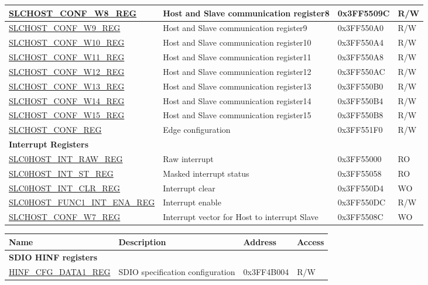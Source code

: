 \begin{longtable}{ | m{6cm} | m{7cm} | m{2cm} | m{1cm} | }
\hyperref[regdesc:SLCHOSTCONFW8REG]{SLCHOST\_CONF\_W8\_REG} & Host and Slave communication register8& 0x3FF5509C & R/W \\ \hline
\hyperref[regdesc:SLCHOSTCONFW9REG]{SLCHOST\_CONF\_W9\_REG} & Host and Slave communication register9& 0x3FF550A0 & R/W \\ \hline
\hyperref[regdesc:SLCHOSTCONFW10REG]{SLCHOST\_CONF\_W10\_REG} & Host and Slave communication register10& 0x3FF550A4 & R/W \\ \hline
\hyperref[regdesc:SLCHOSTCONFW11REG]{SLCHOST\_CONF\_W11\_REG} &Host and Slave communication register11 & 0x3FF550A8 & R/W \\ \hline
\hyperref[regdesc:SLCHOSTCONFW12REG]{SLCHOST\_CONF\_W12\_REG} &Host and Slave communication register12 & 0x3FF550AC & R/W \\ \hline
\hyperref[regdesc:SLCHOSTCONFW13REG]{SLCHOST\_CONF\_W13\_REG} &Host and Slave communication register13 & 0x3FF550B0 & R/W \\ \hline
\hyperref[regdesc:SLCHOSTCONFW14REG]{SLCHOST\_CONF\_W14\_REG} &Host and Slave communication register14 & 0x3FF550B4 & R/W \\ \hline
\hyperref[regdesc:SLCHOSTCONFW15REG]{SLCHOST\_CONF\_W15\_REG} &Host and Slave communication register15 & 0x3FF550B8 & R/W \\ \hline
\hyperref[regdesc:SLCHOSTCONFREG]{SLCHOST\_CONF\_REG} & Edge configuration & 0x3FF551F0 & R/W \\ \hline
\multicolumn{4}{|l|}{\textbf{Interrupt Registers}} \\ \hline
\hyperref[regdesc:SLC0HOSTINTRAWREG]{SLC0HOST\_INT\_RAW\_REG} & Raw interrupt & 0x3FF55000 & RO \\ \hline
\hyperref[regdesc:SLC0HOSTINTSTREG]{SLC0HOST\_INT\_ST\_REG} & Masked interrupt status & 0x3FF55058 & RO \\ \hline
\hyperref[regdesc:SLC0HOSTINTCLRREG]{SLC0HOST\_INT\_CLR\_REG} &Interrupt clear & 0x3FF550D4 & WO \\ \hline
\hyperref[regdesc:SLC0HOSTFUNC1INTENAREG]{SLC0HOST\_FUNC1\_INT\_ENA\_REG} & Interrupt enable& 0x3FF550DC & R/W \\ \hline
\hyperref[regdesc:SLCHOSTCONFW7REG]{SLCHOST\_CONF\_W7\_REG} & Interrupt vector for Host to interrupt Slave& 0x3FF5508C & WO \\ \hline
\end{longtable}


\begin{longtable}{ | p{5cm} | p{7.5cm} | p{2cm} | p{1cm} | }
\hline\rowcolor{lightgray}
Name & Description &  Address & Access \\ \hline
\multicolumn{4}{|l|}{\textbf{SDIO HINF registers}} \\ \hline
\hyperref[regdesc:HINFCFGDATA1REG]{HINF\_CFG\_DATA1\_REG} & SDIO specification configuration& 0x3FF4B004 & R/W \\ \hline
\end{longtable}

